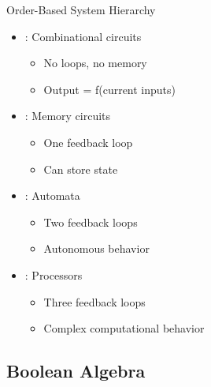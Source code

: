 \begin{frame}{Order-Based System Hierarchy}
\begin{itemize}
\item {}: Combinational circuits
\begin{itemize}
\item No loops, no memory
\item Output = f(current inputs)
\end{itemize}
\vspace{0.3cm}
\item {}: Memory circuits
\begin{itemize}
\item One feedback loop
\item Can store state
\end{itemize}
\vspace{0.3cm}
\item {}: Automata
\begin{itemize}
\item Two feedback loops
\item Autonomous behavior
\end{itemize}
\vspace{0.3cm}
\item {}: Processors
\begin{itemize}
\item Three feedback loops
\item Complex computational behavior
\end{itemize}
\end{itemize}
\end{frame}

\subsection{Boolean Algebra}

